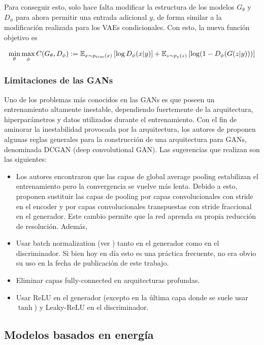 Para conseguir esto, solo hace falta modificar la estructura de los modelos $G_\theta$ y $D_\phi$ para ahora permitir una entrada adicional $y$, de forma similar a la modificación realizada para los VAEs condicionales. Con esto, la nueva función objetivo es

\begin{equation}
	\min_\theta\max_\phi C(G_\theta, D_\phi) := \mathbb{E}_{x\sim p_{\operatorname{true}}(x)}\left[\log D_\phi(x|y)\right] + \mathbb{E}_{z\sim p_z(z)}\left[\log (1-D_\phi(G(z|y)))\right]
	\label{eq:cgan_objective}
\end{equation}

\subsubsection{Limitaciones de las GANs}

Uno de los problemas más conocidos en las GANs es que poseen un entrenamiento altamente inestable, dependiendo fuertemente de la arquitectura, hiperparámetros y datos utilizados durante el entrenamiento. Con el fin de aminorar la inestabilidad provocada por la arquitectura, los autores de \cite{radford2016unsupervised} proponen algunas reglas generales para la construcción de una arquitectura para GANs, denominada DCGAN (deep convolutional GAN). Las sugerencias que realizan son las siguientes:

\begin{itemize}
	\item Los autores encontraron que las capas de global average pooling estabilizan el entrenamiento pero la convergencia se vuelve más lenta. Debido a esto, proponen sustituir las capas de pooling por capas convolucionales con stride en el encoder y por capas convolucionales transpuestas con stride fraccional en el generador. Este cambio permite que la red aprenda su propia reducción de resolución. Además,
	\item Usar batch normalization (ver \cite{ioffe2015batch}) tanto en el generador como en el discriminador. Si bien hoy en día esto es una práctica frecuente, no era obvio su uso en la fecha de publicación de este trabajo.
	\item Eliminar capas fully-connected en arquitecturas profundas.
	\item Usar ReLU en el generador (excepto en la última capa donde se suele usar $\tanh$) y Leaky-ReLU en el discriminador.
\end{itemize}

\subsection{Modelos basados en energía}
\label{dm/generative_models/energy_based}

